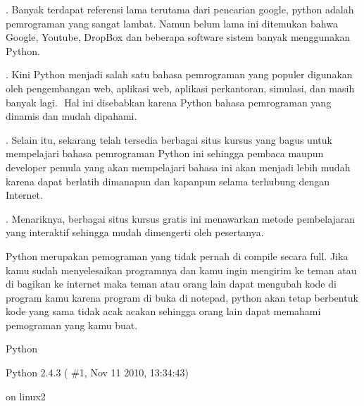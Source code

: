 \noindent 
{\fontsize{14pt}{14pt}. Banyak terdapat referensi lama terutama dari pencarian google, python adalah pemrograman yang sangat lambat. Namun belum lama ini ditemukan bahwa Google, Youtube, DropBox dan beberapa software sistem banyak menggunakan Python. \\} \par
\noindent 
{\fontsize{14pt}{14pt}. Kini Python menjadi salah satu bahasa pemrograman yang populer digunakan oleh pengembangan $  $web, aplikasi $  $web, aplikasi perkantoran, simulasi, dan masih banyak lagi. $  $ Hal ini disebabkan karena Python bahasa pemrograman yang dinamis dan mudah dipahami. \\} \par
\noindent 
{\fontsize{14pt}{14pt}. Selain itu, sekarang telah tersedia berbagai situs kursus yang bagus untuk mempelajari bahasa pemrograman Python ini sehingga pembaca maupun developer pemula yang akan mempelajari bahasa ini akan menjadi lebih mudah karena dapat berlatih dimanapun dan kapanpun selama terhubung dengan Internet. \\} \par
\noindent 
{\fontsize{14pt}{14pt}. Menariknya, berbagai situs kursus gratis ini menawarkan metode pembelajaran yang interaktif sehingga mudah dimengerti oleh pesertanya. \\} \par
\noindent 
{\fontsize{14pt}{14pt}\selectfont Python merupakan pemograman yang tidak pernah di compile secara full. Jika kamu sudah menyelesaikan programnya dan kamu ingin mengirim ke teman atau di bagikan ke internet maka teman atau orang lain dapat mengubah kode di program kamu karena program di buka di notepad, python akan tetap berbentuk kode yang sama tidak acak acakan sehingga orang lain dapat memahami pemograman yang kamu buat. \\} \par
\vspace{14pt}
\noindent 
{\fontsize{14pt}{14pt}\selectfont Python \\} \par
\vspace{14pt}
\noindent 
{\fontsize{14pt}{14pt}\selectfont Python 2.4.3 ( $  \#  $1, Nov 11 2010, 13:34:43) \\} \par
\noindent 
{\fontsize{14pt}{14pt} on linux2 \\} \par
